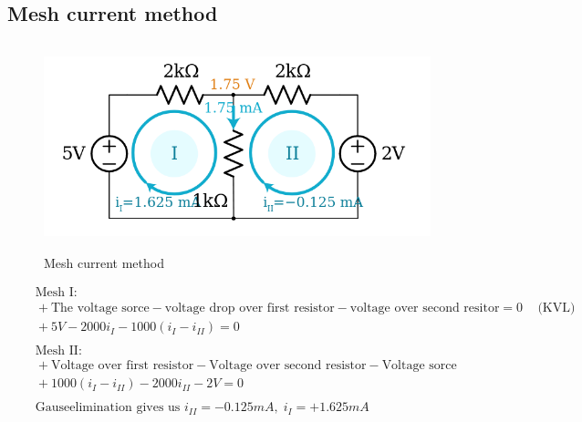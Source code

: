 \newpage
\subsection{Mesh current method}

\begin{figure}[h]
    \vspace{10mm}
    \centering
    \includegraphics[width=12cm, height=6cm]{image/mesh_current_method.png}
    \caption{Mesh current method}
\end{figure}

\begin{align*}
  &\quad  \text{Mesh I: } \\
  &\quad  +\text{The voltage sorce} -\text{voltage drop over first resistor} 
  -\text{voltage over second resitor} = 0 \;\;\; \text{ (KVL)} \\
  &\quad  +5V -2000i_I -1000(i_I-i_{II}) = 0 \\
  &\quad  \\
  &\quad  \text{Mesh II: } \\
  &\quad  +\text{Voltage over first resistor} -\text{Voltage over second resistor} 
  -\text{Voltage sorce} \\
  &\quad  +1000(i_I-i_{II}) -2000i_{II} -2V = 0 \\
  &\quad  \\
  &\quad  \text{Gauseelimination gives us } i_{II} = -0.125mA, \; i_I = +1.625mA \\
\end{align*}


